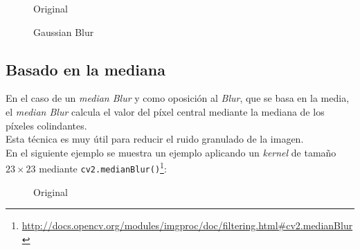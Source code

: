 \begin{figure}[H]
  \caption{Original}
  \centering \setlength\fboxsep{0pt} \setlength\fboxrule{0.5pt}
\end{figure}

\begin{figure}[H]
  \centering \setlength\fboxsep{0pt} \setlength\fboxrule{0.5pt}
  \caption{Gaussian Blur}
\end{figure}


\subsection{Basado en la mediana}\label{tecnica:blur-median}
En el caso de un \emph{median Blur} y como oposición al \emph{Blur},
que se basa en la media, el \emph{median Blur} calcula el valor
del píxel central mediante la mediana de los píxeles colindantes. \\
Esta técnica es muy útil para reducir el ruido granulado de la imagen.\\
En el siguiente ejemplo se muestra un ejemplo aplicando un
\emph{kernel} de tamaño $23 \times 23$ mediante
\texttt{cv2.medianBlur()}\footnote{\url{http://docs.opencv.org/modules/imgproc/doc/filtering.html\#cv2.medianBlur}}:

\begin{figure}[H]
  \caption{Original}
  \centering \setlength\fboxsep{0pt} \setlength\fboxrule{0.5pt}
\end{figure}

